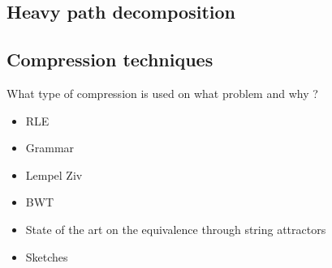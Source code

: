 \subsection{Heavy path decomposition}


\subsection{Compression techniques}
What type of compression is used on what problem and why ?
\begin{itemize}
\item RLE
\item Grammar
\item Lempel Ziv
\item BWT
\item State of the art on the equivalence through string attractors
\item Sketches
\end{itemize}